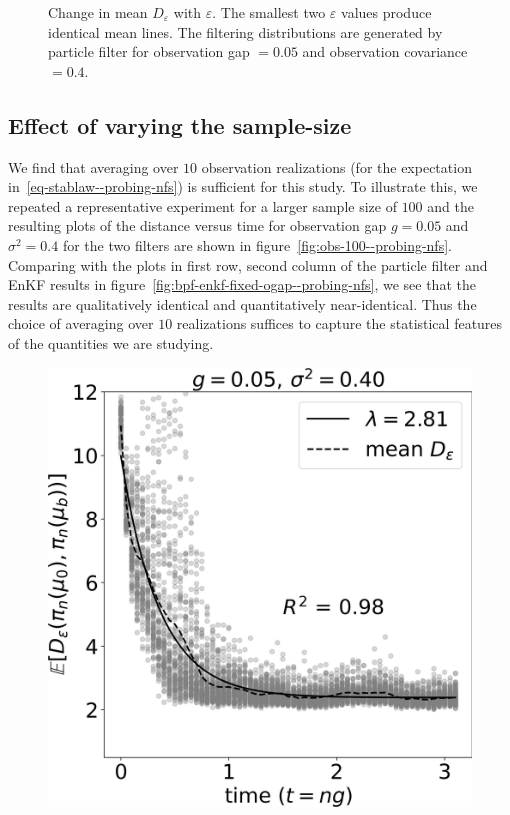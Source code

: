 {\begin{figure}
    \caption{Change in mean $D_\varepsilon$ with $\varepsilon$. The smallest two  $\varepsilon$ values produce identical mean lines. The filtering distributions are generated by particle filter for observation gap  $=0.05$ and observation covariance $=0.4$.}
    \label{fig:bpf-eps-all--probing-nfs}
\end{figure}
}

{\color{mypink}\subsection{Effect of varying the sample-size}\label{ssec-sample-size--probing-nfs}
We find that averaging over $10$ observation realizations (for the expectation in~\eqref{eq-stablaw--probing-nfs}) is sufficient for this study. To illustrate this, we repeated a representative experiment for a larger sample size  of $100$ and the resulting plots of the distance versus time for observation gap $g=0.05$ and $\sigma^2=0.4$ for the two filters are shown in figure~\ref{fig:obs-100--probing-nfs}. Comparing with the plots in first row, second column of the particle filter and EnKF results in figure~\ref{fig:bpf-enkf-fixed-ogap--probing-nfs}, we see that the results are qualitatively identical and quantitatively near-identical. Thus the choice of averaging over $10$ realizations suffices to capture the statistical features of the quantities we are studying.
\begin{figure}
    \includegraphics[scale=0.1]{stability/plots/plots-bpf-rate_obs_100.jpg}

\end{figure}}
